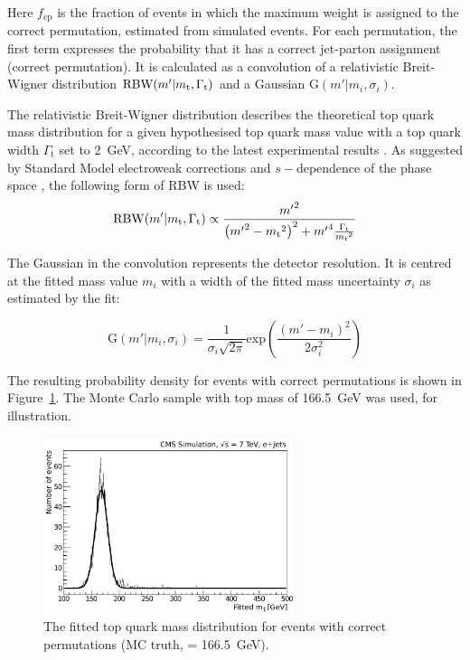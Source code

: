 Here $f_{\textrm{cp}}$ is the fraction of events in which the maximum weight is assigned to the correct permutation,
estimated from simulated \ttbar events. For each permutation, the first term expresses the probability that it has a
correct jet-parton assignment (correct permutation). It is calculated as a convolution of a relativistic Breit-Wigner
distribution $\textrm{RBW}(m'|m_\mathrm{t},\Gamma_{\textrm{t}})$ and a Gaussian $\textrm{G}(m'|m_{i},\sigma_{i})$.

The relativistic Breit-Wigner distribution describes the theoretical top quark mass distribution for a given
hypothesised top quark mass value \mtop with a top quark width $\Gamma_{\textrm{t}}$ set to \SI{2}{\GeV}, according to
the latest experimental results \autocite{top_width_D0}. As suggested by Standard Model electroweak corrections and
$s-$dependence of the phase space \cite{aleph_Z_RBW}, the following form of RBW is used:
\begin{equation}
\textrm{RBW}(m'|m_\mathrm{t},\Gamma_{\textrm{t}}) \propto \frac{{m'}^{2}}{\left({m'}^{2} - {m_\mathrm{t}}^{2}
\right)^{2} + {m'}^{4}\frac{\Gamma_{\textrm{t}}}{{m_\mathrm{t}}^{2}}}
\end{equation}

The Gaussian in the convolution represents the detector resolution. It is centred at the fitted mass value $m_{i}$ with
a width of the fitted mass uncertainty $\sigma_{i}$ as estimated by the fit:

\begin{equation}
\textrm{G}(m'|m_{i},\sigma_{i}) = \frac{1}{\sigma_{i}\sqrt{2\pi}}
\textrm{exp}\left(\frac{(m'-m_{i})^{2}}{2\sigma_{i}^2}\right)
\end{equation}

The resulting probability density for \ttbar events with correct permutations is shown in
Figure~\ref{fig:fitted_ttbar_cp_density}. The Monte Carlo sample with top mass of \SI{166.5}{\GeV} was used, for
illustration.

\begin{figure}[!htpb]
\begin{center}
    \includegraphics[width=0.65\textwidth]{correct_permutations_fitted_top_mass}
	\caption{\label{fig:fitted_ttbar_cp_density}
	The fitted top quark mass distribution for \ttbar events with correct permutations (MC truth, \mtop =
	\SI{166.5}{\GeV}).}
\end{center}
\end{figure}

